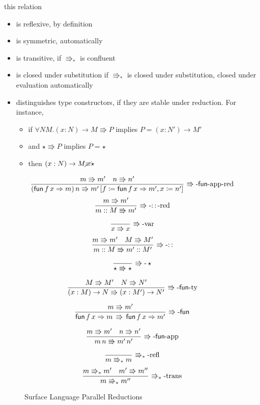 this relation 
\begin{itemize}
\item is reflexive, by definition
\item is symmetric, automatically
\item is transitive, if $\Rrightarrow_{\ast}$ is confluent
\item is closed under substitution if $\Rrightarrow_{\ast}$ is closed under
substitution, closed under evaluation automatically
\item distinguishes type constructors, if they are stable under reduction.
For instance,
\begin{itemize}
\item if $\forall NM.\left(x:N\right)\rightarrow M\Rrightarrow P$ implies $P=\left(x:N'\right)\rightarrow M'$
\item and $\star\Rrightarrow P$ implies $P=\star$
\item then $\left(x:N\right)\rightarrow M\cancel{\equiv}\star$
\end{itemize}
\end{itemize}
\begin{figure}
\[
\frac{m\Rrightarrow m'\quad n\Rrightarrow n'}{\left(\mathsf{fun}\,f\,x\Rightarrow m\right)n\Rrightarrow m'\left[f\coloneqq\mathsf{fun}\,f\,x\Rightarrow m',x\coloneqq n'\right]}\,\operatorname{\Rrightarrow-\mathsf{fun}-app-red}
\]
\[
\frac{m\Rrightarrow m'}{m::M\Rrightarrow m'}\,\operatorname{\Rrightarrow-::-red}
\]

\[
\frac{\,}{x\Rrightarrow x}\,\operatorname{\Rrightarrow-var}
\]
\[
\frac{m\Rrightarrow m'\quad M\Rrightarrow M'}{m::M\Rrightarrow m'::M'}\,\operatorname{\Rrightarrow-::}
\]

\[
\frac{\,}{\star\Rrightarrow\star}\,\operatorname{\Rrightarrow-}\star
\]

\[
\frac{M\Rrightarrow M'\quad N\Rrightarrow N'}{\left(x:M\right)\rightarrow N\Rrightarrow\left(x:M'\right)\rightarrow N'}\,\operatorname{\Rrightarrow-\mathsf{fun}-ty}
\]

\[
\frac{m\Rrightarrow m'}{\mathsf{fun}\,f\,x\Rightarrow m\,\Rrightarrow\,\mathsf{fun}\,f\,x\Rightarrow m'}\,\operatorname{\Rrightarrow-\mathsf{fun}}
\]

\[
\frac{m\Rrightarrow m'\quad n\Rrightarrow n'}{m\,n\Rrightarrow m'\,n'}\,\operatorname{\Rrightarrow-\mathsf{fun}-app}
\]

\[
\frac{\,}{m\Rrightarrow_{\ast}m}\,\operatorname{\Rrightarrow_{\ast}-refl}
\]
\[
\frac{m\Rrightarrow_{\ast}m'\quad m'\Rrightarrow m''}{m\Rrightarrow_{\ast}m''}\,\operatorname{\Rrightarrow_{\ast}-trans}
\]

\caption{Surface Language Parallel Reductions}
\label{fig:surface-reduction}
\end{figure}
  

